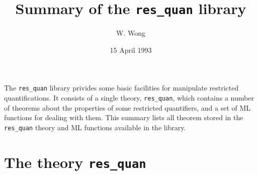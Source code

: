 \documentclass[12pt]{article}
\title{Summary of the {\tt res\_quan} library}
\author{W. Wong}
\date{15 April 1993}
\begin{document}
\maketitle

The {\tt res\_quan} library privides some basic facilities for
manipulate restricted quantifications. It consists of a single theory,
{\tt res\_quan}, which  contains a number of theorems about the
properties of some restricted quantifiers, and a set of ML functions
for dealing with them. This summary lists all theorem stored in the
{\tt res\_quan} theory and ML functions available in the library.

\section{The theory {\tt res\_quan}}
\end{document}
